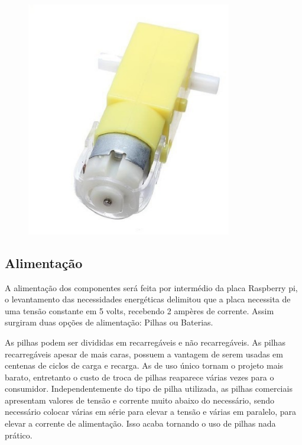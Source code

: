 \begin{figure}[H]
    \centering
    \includegraphics[width=0.8\textwidth]{figuras/motor.eps}
    \caption{}
    \label{fig:catia01}
\end{figure}

\subsection{Alimentação}

A alimentação dos componentes será feita por intermédio da placa Raspberry pi, o levantamento das necessidades energéticas delimitou que a placa necessita de uma tensão constante em 5 volts, recebendo 2 ampères de corrente.  Assim surgiram duas opções de alimentação: Pilhas ou Baterias.

As pilhas podem ser divididas em recarregáveis e não recarregáveis. As pilhas recarregáveis apesar de mais caras, possuem a vantagem de serem usadas em centenas de ciclos de carga e recarga. As de uso único tornam o projeto mais barato, entretanto o custo de troca de pilhas reaparece várias vezes para o consumidor. Independentemente do tipo de pilha utilizada, as pilhas comerciais apresentam valores de tensão e corrente muito abaixo do necessário, sendo necessário colocar várias em série para elevar a tensão e várias em paralelo, para elevar a corrente de alimentação. Isso acaba tornando o uso de pilhas nada prático.

